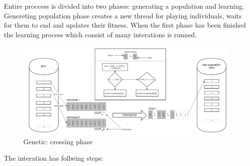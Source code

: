 \documentclass[pdftex]{article}
\begin{document}
Entire proccess is divided into two phases: generating a population and learning.
Genereting population phase creates a new thread for playing individuals, waits for them to end and updates their fitness.
When the first phase has been finished the learning process which consist of many interations is runned.


\begin{figure}[!htb]
	\centering
	\includegraphics[width=\textwidth]{genetic/genetic_crossing.png} 
	\caption{Genetic: crossing phase}
	\label{fig:genetic_crossing}
\end{figure}
\newpage
The interation has follwing steps:
\end{document}
